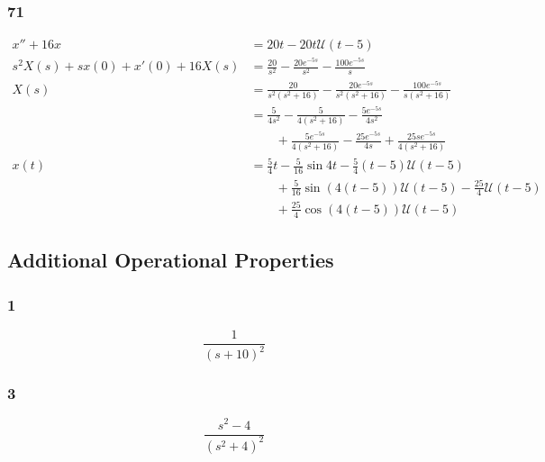 \documentclass{article}
\begin{document}
\subsubsection{71}

\begin{align*}
  x'' + 16 x                          & = 20 t - 20 t \mathcal{U}(t - 5)                                                                        \\
  s^2 X(s) + s x(0) + x'(0) + 16 X(s) & = \frac{20}{s^2} - \frac{20 e^{-5 s}}{s^2} - \frac{100 e^{-5 s}}{s}                                     \\
  X(s)                                & = \frac{20}{s^2 (s^2 + 16)} - \frac{20 e^{-5 s}}{s^2 (s^2 + 16)} - \frac{100 e^{-5 s}}{s (s^2 + 16)}    \\
                                      & = \frac{5}{4 s^2} - \frac{5}{4 (s^2 + 16)} - \frac{5 e^{-5 s}}{4 s^2}                                   \\
                                      & \qquad + \frac{5 e^{-5 s}}{4 (s^2 + 16)} - \frac{25 e^{-5 s}}{4 s} + \frac{25 s e^{-5 s}}{4 (s^2 + 16)} \\
  x(t)                                & = \frac{5}{4} t - \frac{5}{16} \sin 4 t - \frac{5}{4} (t - 5) \mathcal{U}(t - 5)                        \\
                                      & \qquad + \frac{5}{16} \sin (4 (t - 5)) \mathcal{U}(t - 5) - \frac{25}{4} \mathcal{U}(t - 5)             \\
                                      & \qquad + \frac{25}{4} \cos (4 (t - 5)) \mathcal{U}(t - 5)
\end{align*}

\subsection{Additional Operational Properties}

\subsubsection{1}

\[\frac{1}{(s + 10)^2}\]

\subsubsection{3}

\[\frac{s^2 - 4}{(s^2 + 4)^2}\]
\end{document}
